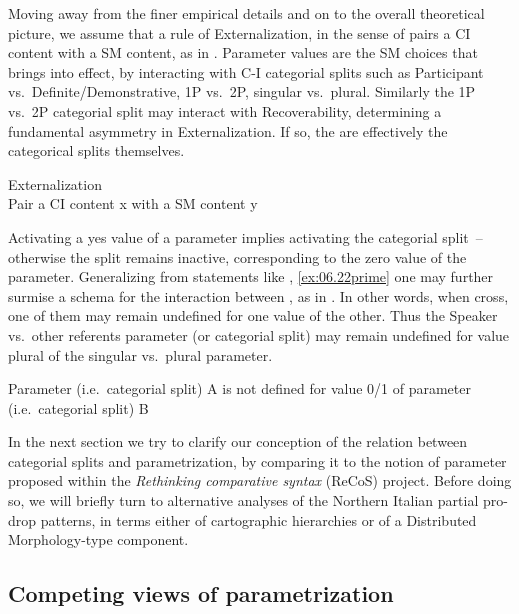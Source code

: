 \documentclass[output=paper]{langsci/langscibook}
\begin{document}
Moving away from the finer empirical details and on to the overall theoretical
picture, we assume that a rule of Externalization, in the sense of
\citet{BerCho2011} pairs a \gls{CI} content with a \gls{SM} content, as in
. Parameter values are the \gls{SM} choices that 
brings into effect, by interacting with C-I categorial splits such as
Participant vs.\ Definite/Demonstrative, 1P vs.\ 2P, singular vs.\ plural.
Similarly the 1P vs.\ 2P categorial split may interact with Recoverability,
determining a fundamental asymmetry in Externalization.  If so, the
 are effectively the categorical splits themselves.

\ea%
    \label{ex:06.26} Externalization\\
    Pair a \gls{CI} content x with a \gls{SM} content y
\z

Activating a yes value of a parameter implies activating the categorial split~–
otherwise the split remains inactive, corresponding to the zero value of the
parameter. Generalizing from statements like ,
\eqref{ex:06.22prime} one may
further surmise a schema for the interaction between , as in
. In other words, when  cross, one of them may remain
undefined for one value of the other. Thus the Speaker vs.\ other referents
parameter (or categorial split) may remain undefined for value plural of the
singular vs.\ plural parameter.

\ea%
    \label{ex:06.27}
    Parameter (i.e.\ categorial split) A is not defined for value 0/1 of
    parameter (i.e.\ categorial split) B
\z

In the next section we try to clarify our conception of the relation between
categorial splits and parametrization, by comparing it to the notion of
parameter proposed within the \emph{Rethinking comparative syntax} (ReCoS) project.
Before doing so, we will briefly turn to alternative analyses of the Northern
Italian partial pro-drop patterns, in terms either of cartographic hierarchies
or of a Distributed Morphology-type component.

\subsection{Competing views of parametrization}\label{sec:06.2.2}
\end{document}
